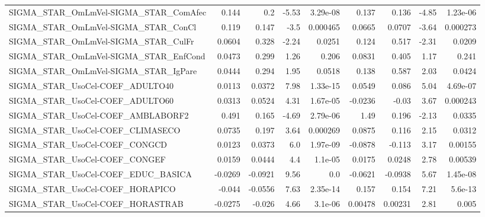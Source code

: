 \begin{tabular}{lrrrrrrrr}
SIGMA\_STAR\_OmLmVel-SIGMA\_STAR\_ComAfec &       0.144 &          0.2 &    -5.53 & 3.29e-08 &      0.137 &       0.136 &        -4.85 &      1.23e-06 \\
SIGMA\_STAR\_OmLmVel-SIGMA\_STAR\_ConCl   &       0.119 &        0.147 &     -3.5 & 0.000465 &     0.0665 &      0.0707 &        -3.64 &      0.000273 \\
SIGMA\_STAR\_OmLmVel-SIGMA\_STAR\_CulFr   &      0.0604 &        0.328 &    -2.24 &   0.0251 &      0.124 &       0.517 &        -2.31 &        0.0209 \\
SIGMA\_STAR\_OmLmVel-SIGMA\_STAR\_EnfCond &      0.0473 &        0.299 &     1.26 &    0.206 &     0.0831 &       0.405 &         1.17 &         0.241 \\
SIGMA\_STAR\_OmLmVel-SIGMA\_STAR\_IgPare  &      0.0444 &        0.294 &     1.95 &   0.0518 &      0.138 &       0.587 &         2.03 &        0.0424 \\
SIGMA\_STAR\_UsoCel-COEF\_ADULTO40       &      0.0113 &       0.0372 &     7.98 & 1.33e-15 &     0.0549 &       0.086 &         5.04 &      4.69e-07 \\
SIGMA\_STAR\_UsoCel-COEF\_ADULTO60       &      0.0313 &       0.0524 &     4.31 & 1.67e-05 &    -0.0236 &       -0.03 &         3.67 &      0.000243 \\
SIGMA\_STAR\_UsoCel-COEF\_AMBLABORF2     &       0.491 &        0.165 &    -4.69 & 2.79e-06 &       1.49 &       0.196 &        -2.13 &        0.0335 \\
SIGMA\_STAR\_UsoCel-COEF\_CLIMASECO      &      0.0735 &        0.197 &     3.64 & 0.000269 &     0.0875 &       0.116 &         2.15 &        0.0312 \\
SIGMA\_STAR\_UsoCel-COEF\_CONGCD         &      0.0123 &       0.0373 &      6.0 & 1.97e-09 &    -0.0878 &      -0.113 &         3.17 &       0.00155 \\
SIGMA\_STAR\_UsoCel-COEF\_CONGEF         &      0.0159 &       0.0444 &      4.4 &  1.1e-05 &     0.0175 &      0.0248 &         2.78 &       0.00539 \\
SIGMA\_STAR\_UsoCel-COEF\_EDUC\_BASICA    &     -0.0269 &      -0.0921 &     9.56 &      0.0 &    -0.0621 &     -0.0938 &         5.67 &      1.45e-08 \\
SIGMA\_STAR\_UsoCel-COEF\_HORAPICO       &      -0.044 &      -0.0556 &     7.63 & 2.35e-14 &      0.157 &       0.154 &         7.21 &       5.6e-13 \\
SIGMA\_STAR\_UsoCel-COEF\_HORASTRAB      &     -0.0275 &       -0.026 &     4.66 &  3.1e-06 &    0.00478 &     0.00231 &         2.81 &         0.005 \\

\end{tabular}
